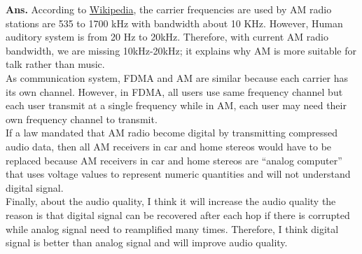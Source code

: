 \documentclass[12pt]{article}
\newenvironment{problem}[2][Problem]{\begin{trivlist}
\item[\hskip \labelsep {\bfseries #1}\hskip \labelsep {\bfseries #2.}]}{\end{trivlist}}
\begin{document}
\begin{problem}{3}
\end{problem}
\textbf{Ans.} According to \href{https://en.wikipedia.org/wiki/Broadcast_band}{Wikipedia}, the carrier frequencies are used by AM radio stations are 535 to 1700 kHz with bandwidth about 10 KHz. However, Human auditory system is from 20 Hz to 20kHz. Therefore, with current AM radio bandwidth, we are missing 10kHz-20kHz; it explains why AM is more suitable for talk rather than music. \\
As communication system, FDMA and AM are similar because each carrier has its own channel. However, in FDMA, all users use same frequency channel but each user transmit at a single frequency while in AM, each user may need their own frequency channel to transmit. \\
If a  law  mandated  that  AM  radio  become  digital  by  transmitting compressed  audio  data, then all AM receivers in car and home stereos would have to be replaced because AM receivers in car and home stereos are ``analog computer'' that uses voltage values to represent numeric quantities and will not understand digital signal. \\ Finally, about the audio quality, I think it will increase the audio quality the reason is that digital signal can be recovered after each hop if there is corrupted while analog signal need to reamplified many times. Therefore, I think digital signal is better than analog signal and will improve audio quality.
\end{document}
